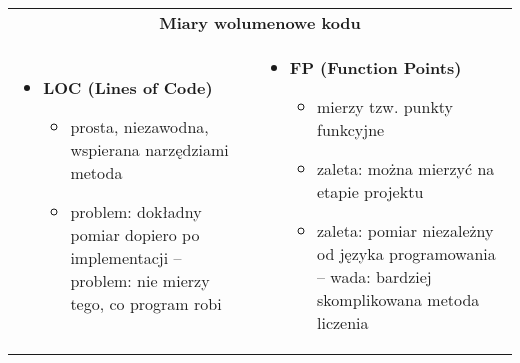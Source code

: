 \documentclass[../main.tex]{subfiles}
\begin{document}
    \begin{table}[H]
        \begin{center}
            \begin{tabular}{p{8cm} p{8cm}}
                \multicolumn{2}{c}{\textbf{Miary wolumenowe kodu}} \\

                \begin{itemize}
                    \item \textbf{LOC (Lines of Code)}
                    \begin{itemize}
                        \item prosta, niezawodna, wspierana narzędziami metoda
                        \item problem: dokładny pomiar dopiero po implementacji – problem: nie mierzy tego, co program robi
                    \end{itemize}
                \end{itemize}
                &
                \begin{itemize}
                    \item \textbf{FP (Function Points)}
                    \begin{itemize}
                        \item mierzy tzw. punkty funkcyjne
                        \item zaleta: można mierzyć na etapie projektu
                        \item zaleta: pomiar niezależny od języka programowania – wada: bardziej skomplikowana metoda liczenia
                    \end{itemize}
                \end{itemize}
            \end{tabular}
        \end{center}
    \end{table}
\end{document}
